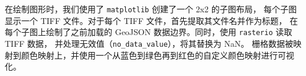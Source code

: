 \documentclass[AutoFakeBold]{LZUThesis-PgD&PhD}
\begin{document}
	在绘制图形时，我们使用了 \texttt{matplotlib} 创建了一个 2x2 的子图布局，
	每个子图显示一个 TIFF 文件。对于每个 TIFF 文件，首先提取其文件名并作为标题，
	在每个子图上绘制了之前加载的 GeoJSON 数据边界。同时，使用 \texttt{rasterio} 读取 TIFF 数据，
	并处理无效值（\texttt{no\_data\_value}），将其替换为 NaN。
	栅格数据被映射到颜色映射上，并使用一个从蓝色到绿色再到红色的自定义颜色映射进行可视化。
	
	
	
	
	
	
%		
%		
	
	
%		
	
%		
%		
	
\end{document}

